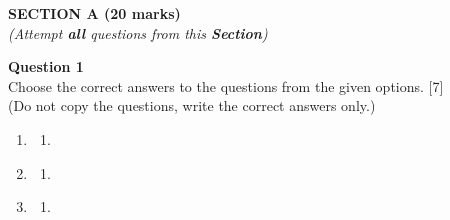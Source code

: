\begin{center}
   \large
   \textbf{SECTION A (20 marks)}\\
   \vspace{5mm}
   \normalsize
   \textit{(Attempt \textbf{all} questions from this \textbf{Section})}
\end{center}
\par
\noindent
\textbf{Question 1}\\
Choose the correct answers to the questions from the given options. \hfill [7]\\
(Do not copy the questions, write the correct answers only.)
\par
\vspace{2mm}
\begin{enumerate}[label=(\roman*)]

    \item 

        \begin{multicols}{2}
        \begin{enumerate}[label=(\alph*)]
            \item 
        \end{enumerate}
        \end{multicols}

    \item 

        \begin{multicols}{2}
        \begin{enumerate}[label=(\alph*)]
            \item 
        \end{enumerate}
        \end{multicols}

    \item 

        \begin{multicols}{2}
        \begin{enumerate}[label=(\alph*)]
            \item 
        \end{enumerate}
        \end{multicols}


\end{enumerate}

